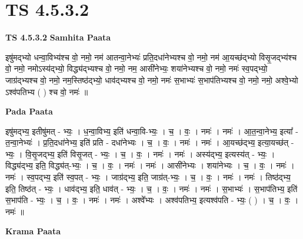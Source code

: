 \documentclass[17pt]{extarticle}
\begin{document}
\section{ TS 4.5.3.2 }

\textbf{TS 4.5.3.2 } \newline
\textbf{Samhita Paata} \newline

इषु॑मद्भ्यो धन्वा॒विभ्य॑श्च वो॒ नमो॒                  नम॑ आतन्वा॒नेभ्यः॑ प्रति॒दधा॑नेभ्यश्च वो॒ नमो॒                                     नम॑ आ॒यच्छ॑द्भ्यो विसृ॒जद्भ्य॑श्च वो॒ नमो॒   नमोऽस्य॑द्भ्यो॒ विद्ध्य॑द्भ्यश्च वो॒ नमो॒                नम॒ आसी॑नेभ्यः॒ शया॑नेभ्यश्च वो॒ नमो॒                                               नमः॑ स्व॒पद्भ्यो॒ जाग्र॑द्भ्यश्च वो॒ नमो॒                                              नम॒स्तिष्ठ॑द्भ्यो॒ धाव॑द्भ्यश्च वो॒ नमो॒     नमः॑ स॒भाभ्यः॑ स॒भाप॑तिभ्यश्च वो॒ नमो॒                                            नमो॒ अश्वे॒भ्यो ऽश्व॑पतिभ्य ( ) श्च वो॒ नमः॑ ॥ \newline

\textbf{Pada Paata} \newline

इषु॑मद्भ्य॒ इतीषु॑मत् - भ्यः॒ । ध॒न्वा॒विभ्य॒ इति॑ धन्वा॒वि-भ्यः॒ । च॒ । वः॒ । नमः॑ । नमः॑ । आ॒त॒न्वा॒नेभ्य॒ इत्या᳚ - त॒न्वा॒नेभ्यः॑ । प्र॒ति॒दधा॑नेभ्य॒ इति॑ प्रति - दधा॑नेभ्यः । च॒ । वः॒ । नमः॑ । नमः॑ । आ॒यच्छ॑द्भ्य॒ इत्या॒यच्छ॑त् - भ्यः॒ । वि॒सृ॒जद्भ्य॒ इति॑ विसृ॒जत् - भ्यः॒ । च॒ । वः॒ । नमः॑ । नमः॑ । अस्य॑द्भ्य॒ इत्यस्य॑त् - भ्यः॒ । विद्ध्य॑द्भ्य॒ इति॒ विद्ध्य॑त्-भ्यः॒ । च॒ । वः॒ । नमः॑ । नमः॑ । आसी॑नेभ्यः । शया॑नेभ्यः । च॒ । वः॒ । नमः॑ । नमः॑ । स्व॒पद्भ्य॒ इति॑ स्व॒पत् - भ्यः॒ । जाग्र॑द्भ्य॒ इति॒ जाग्र॑त्-भ्यः॒ । च॒ । वः॒ । नमः॑ । नमः॑ । तिष्ठ॑द्भ्य॒ इति॒ तिष्ठ॑त् - भ्यः॒ । धाव॑द्भ्य॒ इति॒ धाव॑त् - भ्यः॒ । च॒ । वः॒ । नमः॑ । नमः॑ । स॒भाभ्यः॑ । स॒भाप॑तिभ्य॒ इति॑ स॒भाप॑ति - भ्यः॒ । च॒ । वः॒ । नमः॑ । नमः॑ । अश्वे᳚भ्यः । अश्व॑पतिभ्य॒ इत्यश्व॑पति - भ्यः॒ ( ) । च॒ । वः॒ । नमः॑ ॥  \newline


\textbf{Krama Paata} \newline
\end{document}
